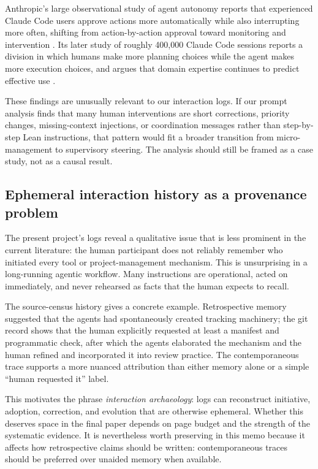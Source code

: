 \documentclass[11pt]{article}
\begin{document}
Anthropic's large observational study of agent autonomy reports that experienced
Claude Code users approve actions more automatically while also interrupting
more often, shifting from action-by-action approval toward monitoring and
intervention \citep{mccain2026autonomy}.  Its later study of roughly 400,000
Claude Code sessions reports a division in which humans make more planning
choices while the agent makes more execution choices, and argues that domain
expertise continues to predict effective use \citep{anthropic2026expertise}.

These findings are unusually relevant to our interaction logs.  If our prompt
analysis finds that many human interventions are short corrections, priority
changes, missing-context injections, or coordination messages rather than
step-by-step Lean instructions, that pattern would fit a broader transition from
micro-management to supervisory steering.  The analysis should still be framed
as a case study, not as a causal result.

\subsection{Ephemeral interaction history as a provenance problem}

The present project's logs reveal a qualitative issue that is less prominent in
the current literature: the human participant does not reliably remember who
initiated every tool or project-management mechanism.  This is unsurprising in a
long-running agentic workflow.  Many instructions are operational, acted on
immediately, and never rehearsed as facts that the human expects to recall.

The source-census history gives a concrete example.  Retrospective memory
suggested that the agents had spontaneously created tracking machinery; the git
record shows that the human explicitly requested at least a manifest and
programmatic check, after which the agents elaborated the mechanism and the
human refined and incorporated it into review practice.  The contemporaneous
trace supports a more nuanced attribution than either memory alone or a simple
``human requested it'' label.

This motivates the phrase \emph{interaction archaeology}: logs can reconstruct
initiative, adoption, correction, and evolution that are otherwise ephemeral.
Whether this deserves space in the final paper depends on page budget and the
strength of the systematic evidence.  It is nevertheless worth preserving in
this memo because it affects how retrospective claims should be written:
contemporaneous traces should be preferred over unaided memory when available.
\end{document}
